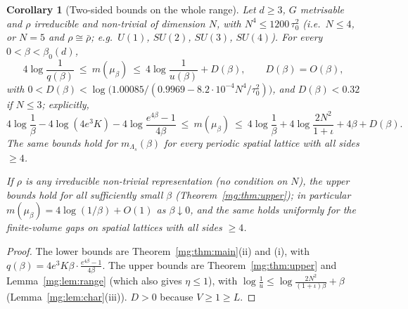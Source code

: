 \documentclass[11pt,a4paper]{article}
\newtheorem{corollary}[theorem]{Corollary}
\theoremstyle{definition}
\theoremstyle{remark}
\begin{document}
\begin{corollary}[Two-sided bounds on the whole range]\label{mg:cor:twosided}
Let $d\ge3$, $G$ metrisable and $\rho$ irreducible and non-trivial of dimension $N$, with $N^4\le1200\,\tau_0^2$ (i.e.\ $N\le4$, or $N=5$ and
$\rho\cong\bar\rho$; e.g.\ $U(1)$, $SU(2)$, $SU(3)$, $SU(4)$). For every $0<\beta<\beta_0(d)$,
\[
4\log\frac1{q(\beta)}\ \le\ m(\mu_\beta)\ \le\ 4\log\frac1{u(\beta)}+D(\beta),\qquad D(\beta)=O(\beta),
\]
with $0<D(\beta)<\log\bigl(1.00085/(0.9969-8.2\cdot10^{-4}N^4/\tau_0^2)\bigr)$, and $D(\beta)<0.32$ if $N\le3$;
explicitly,
\[
4\log\frac1\beta-4\log(4e^3K)-4\log\frac{e^{4\beta}-1}{4\beta}\ \le\ m(\mu_\beta)\ \le\ 4\log\frac1\beta+4\log\frac{2N^2}{1+\iota}+4\beta+D(\beta).
\]
The same bounds hold for $m_{\Lambda_s}(\beta)$ for every periodic spatial lattice with all sides $\ge4$.

If $\rho$ is any irreducible non-trivial representation (no condition on $N$), the upper bounds hold for all sufficiently small $\beta$
(Theorem~\ref{mg:thm:upper}); in particular $m(\mu_\beta)=4\log(1/\beta)+O(1)$ as $\beta\downarrow0$, and the same holds uniformly for the
finite-volume gaps on spatial lattices with all sides $\ge4$.
\end{corollary}

\begin{proof}
The lower bounds are Theorem~\ref{mg:thm:main}(ii) and (i), with $q(\beta)=4e^3K\beta\cdot\frac{e^{4\beta}-1}{4\beta}$. The upper bounds are
Theorem~\ref{mg:thm:upper} and Lemma~\ref{mg:lem:range} (which also gives $\eta\le1$), with $\log\frac1u\le\log\frac{2N^2}{(1+\iota)\beta}+\beta$
(Lemma~\ref{mg:lem:char}(iii)). $D>0$ because $V\ge1\ge L$.
\end{proof}
\end{document}
